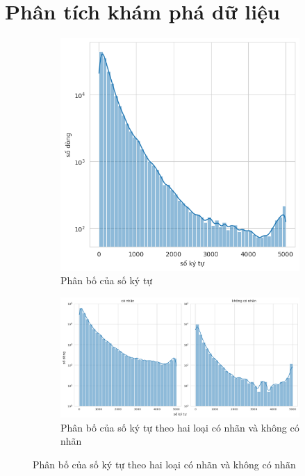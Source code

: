 \section*{Phân tích khám phá dữ liệu}
\begin{figure}[htb]
    \centering
    \begin{subfigure}[t]{0.35\textwidth}
        \centering
        \includegraphics[width=\textwidth]{chapter_2/image/dist_number_of_chars.png}
        \caption{Phân bố của số ký tự}
    \end{subfigure}%
    \begin{subfigure}[t]{0.65\textwidth}
        \centering
        \includegraphics[width=\textwidth]{chapter_2/image/dist_number_of_chars_has_label.png}
        \caption{Phân bố của số ký tự theo hai loại có nhãn và không có nhãn}

\end{subfigure}
\end{figure}
